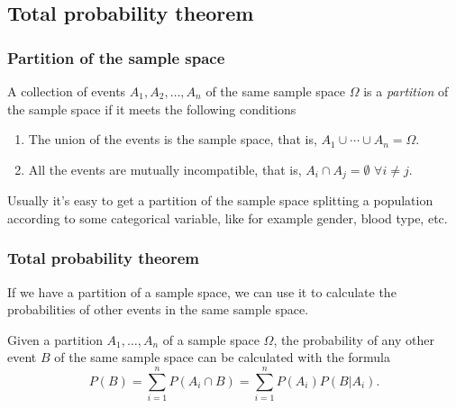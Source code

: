 \subsection{Total probability theorem}

\begin{frame}
\frametitle{Partition of the sample space}
\begin{definition}
A collection of events $A_1,A_2,\ldots,A_n$ of the same sample space $\Omega$ is a \emph{partition} of the sample space
if it meets the following conditions
\begin{enumerate}
\item The union of the events is the sample space, that is, $A_1\cup \cdots\cup A_n =\Omega$.
\item All the events are mutually incompatible, that is, $A_i\cap A_j = \emptyset$ $\forall i\neq j$.
\end{enumerate}
\end{definition}

\begin{center}

\end{center}

Usually it's easy to get a partition of the sample space splitting a population according to some categorical variable,
like for example gender, blood type, etc.
\end{frame}


\begin{frame}
\frametitle{Total probability theorem}
If we have a partition of a sample space, we can use it to calculate the probabilities of other events in the same
sample space.
\begin{theorem}
Given a partition $A_1,\ldots,A_n$ of a sample space $\Omega$, the probability of any other event $B$ of the same sample
space can be calculated with the formula
\[
P(B) = \sum_{i=1}^n P(A_i\cap B) = \sum_{i=1}^n P(A_i)P(B|A_i).
\]
\end{theorem}
\end{frame}


